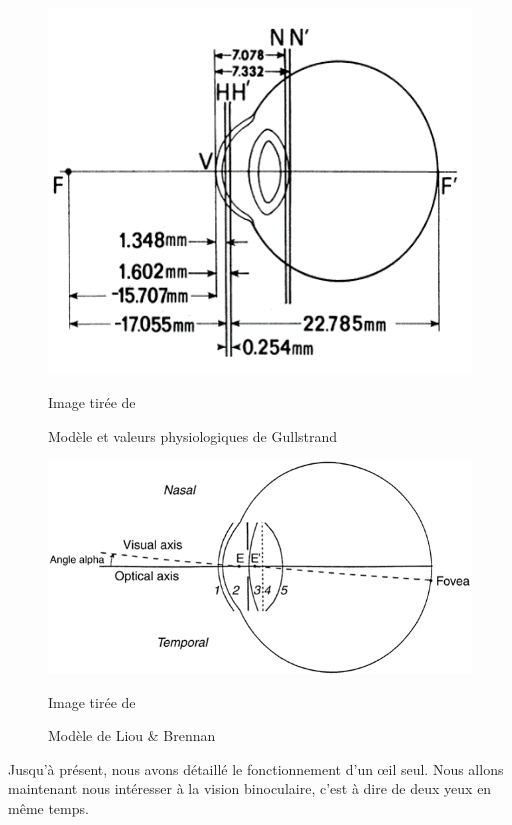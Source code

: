 	\begin{figure}
		\centering
		\includegraphics[scale=1.25]{Figures/GullstrandModel}
		\caption{Modèle et valeurs physiologiques de Gullstrand}{Image tirée de \citep{liou_anatomically_1997}}
		\label{fig:modele_gullstrand}
	\end{figure}
	
	\begin{figure}
		\centering
		\includegraphics[scale=1]{Figures/LiouBrennanModel}
		\caption{Modèle de Liou \& Brennan}{Image tirée de \citep{liou_anatomically_1997}}
		\label{fig:modele_liou_brennan}
	\end{figure}
	
	\par Jusqu'à présent, nous avons détaillé le fonctionnement d'un œil seul. Nous allons maintenant nous intéresser à la vision binoculaire, c'est à dire de deux yeux en même temps.
	
